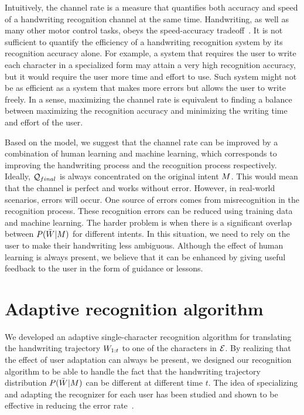 \documentclass{sigchi}
\begin{document}
Intuitively, the channel rate is a measure that quantifies both
accuracy and speed of a handwriting recognition channel at the same
time. Handwriting, as well as many other motor control tasks, obeys
the speed-accuracy tradeoff~\cite{Fitts1954}. It is not sufficient to
quantify the efficiency of a handwriting recognition system by its
recognition accuracy alone. For example, a system that requires the
user to write each character in a specialized form may attain a very
high recognition accuracy, but it would require the user more time and
effort to use. Such system might not be as efficient as a system that
makes more errors but allows the user to write freely. In a sense,
maximizing the channel rate is equivalent to finding a balance between
maximizing the recognition accuracy and minimizing the writing time
and effort of the user.

Based on the model, we suggest that the channel rate can be improved
by a combination of human learning and machine learning, which
corresponds to improving the handwriting process and the recognition
process respectively. Ideally, $\mathcal{Q}_{final}$ is always concentrated
on the original intent $M$. This would mean that the channel is
perfect and works without error. However, in real-world scenarios,
errors will occur. One source of errors comes from misrecognition in
the recognition process. These recognition errors can be reduced using
training data and machine learning. The harder problem is when there
is a significant overlap between $P(\bar{W} | M)$ for different
intents. In this situation, we need to rely on the user to make
their handwriting less ambiguous. Although the effect of human
learning is always present, we believe that it can be enhanced by
giving useful feedback to the user in the form of guidance or lessons.


\section{Adaptive recognition algorithm}
\label{sec:recognition_algorithm}

We developed an adaptive single-character recognition algorithm for
translating the handwriting trajectory $W_{1:{t}}$ to one of the
characters in $\mathcal{E}$. By realizing that the effect of user
adaptation can always be present, we designed our recognition
algorithm to be able to handle the fact that the handwriting
trajectory distribution $P(\bar{W} | M)$ can be different at
different time $t$. The idea of specializing and adapting the
recognizer for each user has been studied and shown to be effective in
reducing the error rate~\cite{Connell2002, Matic93, Kienzle06}.
\end{document}
